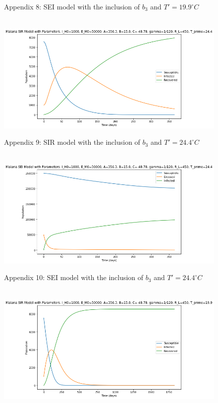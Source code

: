 \documentclass[
	12pt,				%
	oneside,			%
	a4paper,			%
	english,			%
	brazil				%
	]{abntex2}
\begin{document}
\begin{apendicesenv}
\begin{figure}[!ht]
	\caption*{Appendix 8: SEI model with the inclusion of $b_3$ and $T'=19.9^\circ C$}
\end{figure}
\newpage
\begin{figure}[!ht]
	\centering
	\hbox{\hspace{-1.0em} \includegraphics[scale=0.6] {THESIS-SIR_Correcao_b3_T_linha_24_4.png}}
	\caption*{Appendix 9: SIR model with the inclusion of $b_3$ and $T'=24.4^\circ C$}
\end{figure} 
\begin{figure}[!ht]
	\centering
	\hbox{\hspace{-1.0em} \includegraphics[scale=0.6] {THESIS-SEI_Correcao_b3_T_linha_24_4.png}}
	\caption*{Appendix 10: SEI model with the inclusion of $b_3$ and $T'=24.4^\circ C$}
\end{figure}
\newpage
\begin{figure}[!ht]
	\centering
	\hbox{\hspace{-1.2em} \includegraphics[scale=0.6] {THESIS-SIR_Correcao_l_b3_T_linha_19_9.png}}

\end{figure}
\end{apendicesenv}
\end{document}
